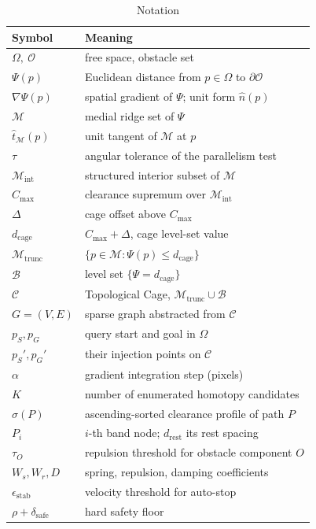 \documentclass[conference]{IEEEtran}
\begin{document}
\begin{table}[htbp]
\caption{Notation}
\label{tab:notation}
\begin{center}
\renewcommand{\arraystretch}{1.12}
\begin{tabular}{@{}ll@{}}
\toprule
\textbf{Symbol} & \textbf{Meaning} \\ \midrule
$\Omega,\ \mathcal{O}$ & free space, obstacle set \\
$\Psi(p)$ & Euclidean distance from $p\in\Omega$ to $\partial\mathcal{O}$ \\
$\nabla\Psi(p)$ & spatial gradient of $\Psi$; unit form $\hat{n}(p)$ \\
$\mathcal{M}$ & medial ridge set of $\Psi$ \\
$\hat{t}_{\mathcal{M}}(p)$ & unit tangent of $\mathcal{M}$ at $p$ \\
$\tau$ & angular tolerance of the parallelism test \\
$\mathcal{M}_{\mathrm{int}}$ & structured interior subset of $\mathcal{M}$ \\
$C_{\max}$ & clearance supremum over $\mathcal{M}_{\mathrm{int}}$ \\
$\Delta$ & cage offset above $C_{\max}$ \\
$d_{\mathrm{cage}}$ & $C_{\max}+\Delta$, cage level-set value \\
$\mathcal{M}_{\mathrm{trunc}}$ & $\{p\in\mathcal{M}:\Psi(p)\le d_{\mathrm{cage}}\}$ \\
$\mathcal{B}$ & level set $\{\Psi = d_{\mathrm{cage}}\}$ \\
$\mathcal{C}$ & Topological Cage, $\mathcal{M}_{\mathrm{trunc}}\cup\mathcal{B}$ \\
$G=(V,E)$ & sparse graph abstracted from $\mathcal{C}$ \\
$p_S,p_G$ & query start and goal in $\Omega$ \\
$p_S',p_G'$ & their injection points on $\mathcal{C}$ \\
$\alpha$ & gradient integration step (pixels) \\
$K$ & number of enumerated homotopy candidates \\
$\sigma(P)$ & ascending-sorted clearance profile of path $P$ \\
$P_i$ & $i$-th band node; $d_{\mathrm{rest}}$ its rest spacing \\
$\tau_O$ & repulsion threshold for obstacle component $O$ \\
$W_s,W_r,D$ & spring, repulsion, damping coefficients \\
$\epsilon_{\mathrm{stab}}$ & velocity threshold for auto-stop \\
$\rho+\delta_{\mathrm{safe}}$ & hard safety floor \\ \bottomrule
\end{tabular}
\end{center}
\end{table}
\end{document}
